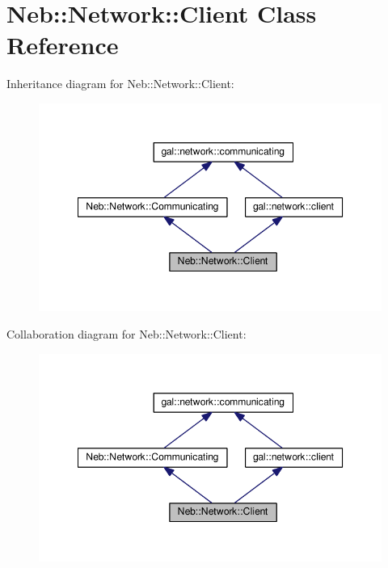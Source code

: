 \hypertarget{classNeb_1_1Network_1_1Client}{\section{Neb\-:\-:Network\-:\-:Client Class Reference}
\label{classNeb_1_1Network_1_1Client}
}


Inheritance diagram for Neb\-:\-:Network\-:\-:Client\-:
\nopagebreak
\begin{figure}[H]
\begin{center}
\leavevmode
\includegraphics[width=349pt]{classNeb_1_1Network_1_1Client__inherit__graph}
\end{center}
\end{figure}


Collaboration diagram for Neb\-:\-:Network\-:\-:Client\-:
\nopagebreak
\begin{figure}[H]
\begin{center}
\leavevmode
\includegraphics[width=349pt]{classNeb_1_1Network_1_1Client__coll__graph}
\end{center}
\end{figure}
